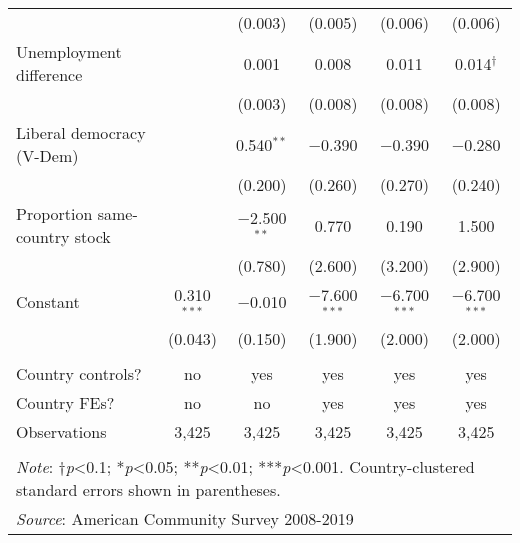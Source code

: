 \documentclass[
  11pt,
]{article}
\begin{document}
\begin{table}[H]
\begin{tabular}{@{\extracolsep{5pt}}lccccc}
  &  & (0.003) & (0.005) & (0.006) & (0.006) \\ 
  Unemployment difference &  & 0.001 & 0.008 & 0.011 & 0.014$^{†}$ \\ 
  &  & (0.003) & (0.008) & (0.008) & (0.008) \\ 
  Liberal democracy (V-Dem) &  & 0.540$^{**}$ & $-$0.390 & $-$0.390 & $-$0.280 \\ 
  &  & (0.200) & (0.260) & (0.270) & (0.240) \\ 
  Proportion same-country stock &  & $-$2.500$^{**}$ & 0.770 & 0.190 & 1.500 \\ 
  &  & (0.780) & (2.600) & (3.200) & (2.900) \\ 
  Constant & 0.310$^{***}$ & $-$0.010 & $-$7.600$^{***}$ & $-$6.700$^{***}$ & $-$6.700$^{***}$ \\ 
  & (0.043) & (0.150) & (1.900) & (2.000) & (2.000) \\ 
 \hline \\[-1.8ex] 
Country controls? & no & yes & yes & yes & yes \\ 
Country FEs? & no & no & yes & yes & yes \\ 
Observations & 3,425 & 3,425 & 3,425 & 3,425 & 3,425 \\ 
\hline 
\hline \\[-1.8ex] 
\multicolumn{6}{l}{\parbox[t]{.8\textwidth}{\textit{Note}: †\textit{p}<0.1; *\textit{p}<0.05; **\textit{p}<0.01; ***\textit{p}<0.001. Country-clustered standard errors shown in parentheses.}} \\ 
\multicolumn{6}{l}{\textit{Source}: American Community Survey 2008-2019} \\ 
\end{tabular} 
\end{table}
\end{document}

